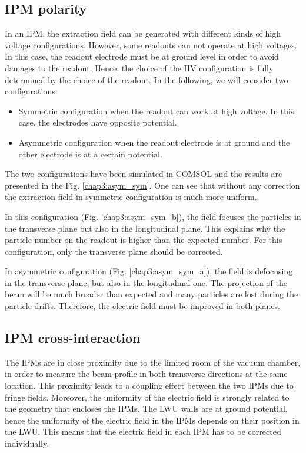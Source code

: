 \begin{refsection}
  \subsection{IPM polarity}

  In an IPM, the extraction field can be generated with different kinds of high voltage configurations. However, some readouts can not operate at high voltages. In this case, the readout electrode must be at ground level in order to avoid damages to the readout. Hence, the choice of the HV configuration is fully determined by the choice of the readout. In the following, we will consider two configurations:
  \begin{itemize}
    \item Symmetric configuration when the readout can work at high voltage. In this case, the electrodes have opposite potential.
    \item Asymmetric configuration when the readout electrode is at ground and the other electrode is at a certain potential.
  \end{itemize}

  The two configurations have been simulated in COMSOL and the results are presented in the Fig. \ref{chap3:asym_sym}. One can see that without any correction the extraction field in symmetric configuration is much more uniform.

  

  In this configuration (Fig. \ref{chap3:asym_sym_b}), the field focuses the particles in the transverse plane but also in the longitudinal plane. This explains why the particle number on the readout is higher than the expected number. For this configuration, only the transverse plane should be corrected.

  In asymmetric configuration (Fig. \ref{chap3:asym_sym_a}), the field is defocusing in the transverse plane, but also in the  longitudinal one. The projection of the beam will be much broader than expected and many particles are lost during the particle drifts. Therefore, the electric field must be improved in both planes.


  \subsection{IPM cross-interaction}

  The IPMs are in close proximity due to the limited room of the vacuum chamber, in order to measure the beam profile in both  transverse  directions at the same location. This proximity leads to a coupling effect between the two IPMs due to fringe fields. Moreover, the uniformity of the electric field is strongly related to the geometry that encloses the IPMs. The LWU walls are at ground potential, hence the uniformity of the electric field in the IPMs depends on their position in the LWU. This means that the electric field in each IPM has to be corrected individually.


\end{refsection}
